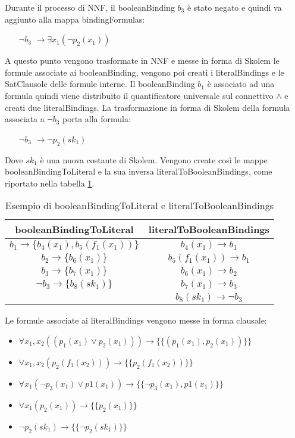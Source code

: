 \documentclass[./main.tex]{subfiles}
\begin{document}
Durante il processo di NNF, il booleanBinding $b_3$ è stato negato e quindi va aggiunto alla mappa bindingFormulas:

\begin{itemize}
    \item [$\lnot b_3$] $\rightarrow \exists x_1(\lnot p_2(x_1))$
\end{itemize}

A questo punto vengono trasformate in NNF e messe in forma di Skolem le formule associate ai booleanBinding,
vengono poi creati i literalBindings e le SatClausole delle formule interne.
Il booleanBinding $b_1$ è associato ad una formula \cb quindi 
viene distribuito il quantificatore universale sul connettivo $\land$ e creati due literalBindings.
La trasformazione in forma di Skolem della formula associata a $\lnot b_3$ porta alla formula:
\begin{itemize}
    \item [$\lnot b_3$] $\rightarrow \lnot p_2(sk_1)$
\end{itemize}
Dove $sk_1$ è una nuova costante di Skolem. 
Vengono create così le mappe booleanBindingToLiteral e la sua inversa literalToBooleanBindings,
come riportato nella tabella \ref{tab:bindingToLiteral}.

\begin{table}[H]
    \label{tab:bindingToLiteral}
    \centering
    \begin{tabular}{|c|c|}
        \hline
        \textbf{booleanBindingToLiteral} & \textbf{literalToBooleanBindings} \\
        \hline
        $b_1 \rightarrow \{b_4(x_1), b_5(f_1(x_1))\}$ & $b_4(x_1) \rightarrow b_1$\\
        $b_2 \rightarrow \{b_6(x_1)\}$ & $b_5(f_1(x_1)) \rightarrow b_1$ \\
        $b_3 \rightarrow \{b_7(x_1)\}$ & $b_6(x_1) \rightarrow b_2$ \\
        $\lnot b_3 \rightarrow \{b_8(sk_1)\}$ & $b_7(x_1) \rightarrow b_3$ \\
        & $b_8(sk_1) \rightarrow \lnot b_3$ \\
        \hline
    \end{tabular}
    \caption{Esempio di booleanBindingToLiteral e literalToBooleanBindings}
\end{table}

Le formule associate ai literalBindings vengono messe in forma clausale:

\begin{itemize}
    \item $\forall x_1, x_2 ((p_1(x_1) \lor p_2(x_1))) \rightarrow \{\{(p_1(x_1), p_2(x_1))\}\}$
    \item $\forall x_1, x_2 (p_2(f_1(x_2))) \rightarrow \{\{p_2(f_1(x_2))\}\}$
    \item $\forall x_1 (\lnot p_3(x_1) \lor p1(x_1)) \rightarrow \{\{\lnot p_3(x_1), p1(x_1)\}\}$
    \item $\forall x_1(p_2(x_1)) \rightarrow \{\{p_2(x_1)\}\}$
    \item $\lnot p_2(sk_1) \rightarrow \{\{\lnot p_2(sk_1)\}\}$
\end{itemize}
\end{document}
